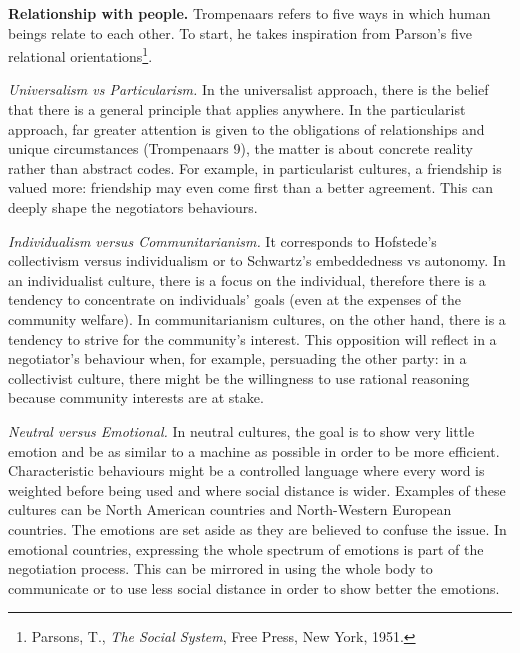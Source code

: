 \documentclass[../main.tex]{subfiles}
\begin{document}
\textbf{Relationship with people.} Trompenaars refers to five ways in which human beings relate to each other. To start, he takes inspiration from Parson's five relational orientations\footnote{Parsons, T., \textit{The Social System}, Free Press, New York, 1951.}.

\textit{Universalism vs Particularism.} In the universalist approach, there is the belief that there is a general principle that applies anywhere. In the particularist approach, far greater attention is given to the obligations of relationships and unique circumstances (Trompenaars 9), the matter is about concrete reality rather than abstract codes. For example, in particularist cultures, a friendship is valued more: friendship may even come first than a better agreement. This can deeply shape the negotiators behaviours.

\textit{Individualism versus Communitarianism.} It corresponds to Hofstede's collectivism versus individualism or to Schwartz's embeddedness vs autonomy. In an individualist culture, there is a focus on the individual, therefore there is a tendency to concentrate on individuals' goals (even at the expenses of the community welfare). In communitarianism cultures, on the other hand, there is a tendency to strive for the community's interest. This opposition will reflect in a negotiator's behaviour when, for example, persuading the other party: in a collectivist culture, there might be the willingness to use rational reasoning because community interests are at stake.

\textit{Neutral versus Emotional.} In neutral cultures, the goal is to show very little emotion and be as similar to a machine as possible in order to be more efficient. Characteristic behaviours might be a controlled language where every word is weighted before being used and where social distance is wider. Examples of these cultures can be North American countries and North-Western European countries. The emotions are set aside as they are believed to confuse the issue. In emotional countries, expressing the whole spectrum of emotions is part of the negotiation process. This can be mirrored in using the whole body to communicate or to use less social distance in order to show better the emotions.
\end{document}

